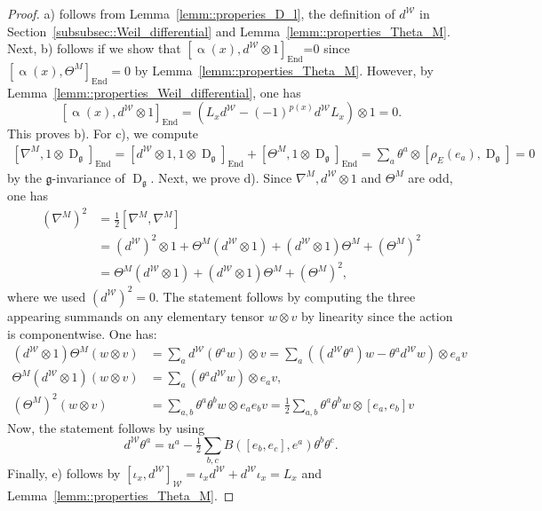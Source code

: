 \documentclass[11pt]{amsart}
\newcommand{\End}{\operatorname{End}}
\newcommand{\Dirac}{\operatorname{D}}
\def\WW{{\mathcal{W}}}
\def\gg{{\mathfrak{g}}}
\theoremstyle{plain}
\theoremstyle{remark}
\theoremstyle{definition}
\numberwithin{equation}{section}
\theoremstyle{remark}
\begin{document}
\begin{proof}
 a) follows from Lemma~\ref{lemm::properies_D_l}, the definition of $d^{\WW}$ in Section~\ref{subsubsec::Weil_differential} and Lemma~\ref{lemm::properties_Theta_M}. Next, b) follows if we show that $[\upalpha(x), d^{\mathcal{W}}\otimes 1]_{\End}$=0 since $[\upalpha(x),\Theta^{M}]_{\End}=0$ by Lemma~\ref{lemm::properties_Theta_M}. However, by Lemma~\ref{lemm::properties_Weil_differential}, one has
 \[
 [\upalpha(x), d^{\mathcal{W}}\otimes 1]_{\End}=(L_{x} d^{\mathcal{W}}-(-1)^{p(x)}d^{\WW}L_{x}) \otimes 1=0.
 \]
 This proves b). For c), we compute
 \[
 \begin{aligned}
 [\nabla^{M}, 1 \otimes \Dirac_{\gg}]_{\End}=[d^{\mathcal{W}}\otimes 1, 1 \otimes \Dirac_{\gg}]_{\End}+[\Theta^{M}, 1 \otimes \Dirac_{\gg}]_{\End}=\sum_{a} \theta^{a}\otimes [\rho_{E}(e_{a}),\Dirac_{\gg}]=0
 \end{aligned}
 \]
 by the $\gg$-invariance of $\Dirac_{\gg}$. Next, we prove d). Since $\nabla^{M}, d^{\mathcal{W}}\otimes 1$ and $\Theta^{M}$ are odd, one has
 \begin{equation*} \begin{split}(\nabla^{M})^{2} &=\tfrac{1}{2}[\nabla^{M}, \nabla^{M}] \\ &=(d^{\mathcal{W}})^{2}\otimes 1 + \Theta^{M}(d^{\mathcal{W}}\otimes 1)+(d^{\mathcal{W}}\otimes 1)\Theta^{M}+(\Theta^{M})^{2}\\ &=\Theta^{M}(d^{\mathcal{W}}\otimes 1)+(d^{\mathcal{W}}\otimes 1)\Theta^{M}+(\Theta^{M})^{2},
 \end{split}
 \end{equation*}
 where we used $(d^{\mathcal{W}})^{2}=0$.
The statement follows by computing the three appearing summands on any elementary tensor $w \otimes v$ by linearity since the action is componentwise. One has:
\[
\begin{aligned}
 (d^{\mathcal{W}}\otimes 1)\Theta^{M}(w \otimes v)&=\sum_{a} d^{\mathcal{W}}(\theta^{a}w)\otimes v=\sum_{a} ((d^{\mathcal{W}}\theta^{a})w-\theta^{a}d^{\mathcal{W}}w)\otimes e_{a}v \\ 
 \Theta^{M} (d^{\mathcal{W}}\otimes 1)(w\otimes v) &=\sum_{a}(\theta^{a}d^{\mathcal{W}}w)\otimes e_{a}v, 
 \\ 
 (\Theta^{M})^{2}(w \otimes v) &=\sum_{a,b}\theta^{a}\theta^{b}w\otimes e_{a}e_{b}v=\tfrac{1}{2}\sum_{a,b}\theta^{a}\theta^{b}w\otimes [e_{a},e_{b}]v
\end{aligned}
\]
Now, the statement follows by using
\[
d^{\mathcal{W}}\theta^{a}=u^{a}-\tfrac{1}{2}\sum_{b,c}B([e_{b},e_{c}],e^{a})\theta^{b}\theta^{c}.
\]
Finally, e) follows by $[\iota_{x},d^{\mathcal{W}}]_{\mathcal{W}}=\iota_{x}d^{\mathcal{W}}+d^{\mathcal{W}}\iota_{x}=L_{x}$ and Lemma~\ref{lemm::properties_Theta_M}.
\end{proof}
\end{document}
